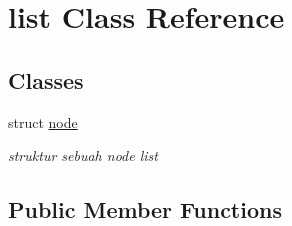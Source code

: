 \hypertarget{classlist}{}\section{list Class Reference}
\label{classlist}
\subsection*{Classes}
\begin{DoxyCompactItemize}
\item 
struct \hyperlink{structlist_1_1node}{node}
\begin{DoxyCompactList}\small\item\em struktur sebuah node list \end{DoxyCompactList}\end{DoxyCompactItemize}
\subsection*{Public Member Functions}
